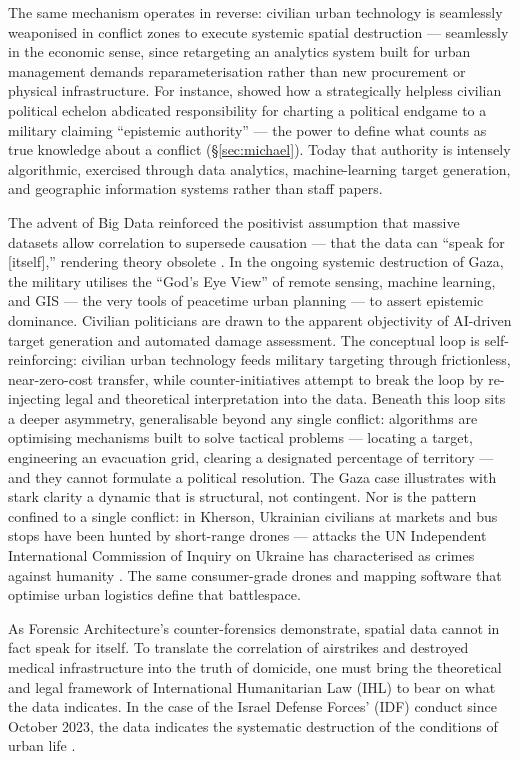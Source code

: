 \documentclass[12pt,a4paper,twoside]{report}
\begin{document}
The same mechanism operates in reverse: civilian urban technology is seamlessly weaponised in conflict zones to execute systemic spatial destruction — seamlessly in the economic sense, since retargeting an analytics system built for urban management demands reparameterisation rather than new procurement or physical infrastructure. For instance, \textcite{michael2007} showed how a strategically helpless civilian political echelon abdicated responsibility for charting a political endgame to a military claiming ``epistemic authority'' — the power to define what counts as true knowledge about a conflict (§\ref{sec:michael}). Today that authority is intensely algorithmic, exercised through data analytics, machine-learning target generation, and geographic information systems rather than staff papers.

The advent of Big Data reinforced the positivist assumption that massive datasets allow correlation to supersede causation — that the data can ``speak for [itself],'' rendering theory obsolete \parencite[p.~1]{anderson2008}. In the ongoing systemic destruction of Gaza, the military utilises the ``God's Eye View'' \parencite[p.~269]{sadowski2026} of remote sensing, machine learning, and GIS — the very tools of peacetime urban planning — to assert epistemic dominance. Civilian politicians are drawn to the apparent objectivity of AI-driven target generation and automated damage assessment. The conceptual loop is self-reinforcing: civilian urban technology feeds military targeting through frictionless, near-zero-cost transfer, while counter-initiatives attempt to break the loop by re-injecting legal and theoretical interpretation into the data. Beneath this loop sits a deeper asymmetry, generalisable beyond any single conflict: algorithms are optimising mechanisms built to solve tactical problems — locating a target, engineering an evacuation grid, clearing a designated percentage of territory — and they cannot formulate a political resolution. The Gaza case illustrates with stark clarity a dynamic that is structural, not contingent. Nor is the pattern confined to a single conflict: in Kherson, Ukrainian civilians at markets and bus stops have been hunted by short-range drones — attacks the UN Independent International Commission of Inquiry on Ukraine has characterised as crimes against humanity \parencite{uncoi2025}. The same consumer-grade drones and mapping software that optimise urban logistics define that battlespace.

As Forensic Architecture's counter-forensics demonstrate, spatial data cannot in fact speak for itself. To translate the correlation of airstrikes and destroyed medical infrastructure into the truth of domicide, one must bring the theoretical and legal framework of International Humanitarian Law (IHL) to bear on what the data indicates. In the case of the Israel Defense Forces' (IDF) conduct since October 2023, the data indicates the systematic destruction of the conditions of urban life \parencite{forensic2023}.
\end{document}
